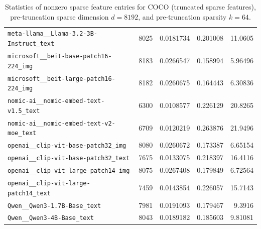 \begin{table}[htbp]
{\begin{tabular}{lrrrr}
\texttt{meta-llama\_\_Llama-3.2-3B-Instruct\_text} & 8025 & 0.0181734 & 0.201008 & 11.0605 \\
\texttt{microsoft\_\_beit-base-patch16-224\_img} & 8183 & 0.0266547 & 0.158994 & 5.96496 \\
\texttt{microsoft\_\_beit-large-patch16-224\_img} & 8182 & 0.0260675 & 0.164443 & 6.30836 \\
\texttt{nomic-ai\_\_nomic-embed-text-v1.5\_text} & 6300 & 0.0108577 & 0.226129 & 20.8265 \\
\texttt{nomic-ai\_\_nomic-embed-text-v2-moe\_text} & 6709 & 0.0120219 & 0.263876 & 21.9496 \\
\texttt{openai\_\_clip-vit-base-patch32\_img} & 8080 & 0.0260672 & 0.173387 & 6.65154 \\
\texttt{openai\_\_clip-vit-base-patch32\_text} & 7675 & 0.0133075 & 0.218397 & 16.4116 \\
\texttt{openai\_\_clip-vit-large-patch14\_img} & 8075 & 0.0267408 & 0.179849 & 6.72564 \\
\texttt{openai\_\_clip-vit-large-patch14\_text} & 7459 & 0.0143854 & 0.226057 & 15.7143 \\
\texttt{Qwen\_\_Qwen3-1.7B-Base\_text} & 7981 & 0.0191093 & 0.179467 & 9.3916 \\
\texttt{Qwen\_\_Qwen3-4B-Base\_text} & 8043 & 0.0189182 & 0.185603 & 9.81081 \\
\bottomrule
\end{tabular}
}%
\caption{Statistics of nonzero sparse feature entries for COCO (truncated sparse features), pre-truncation sparse dimension $d=8192$, and pre-truncation sparsity $k=64$.}
\label{tab:sparse-feature-entries-coco-truncated-d8192-k64}
\end{table}

